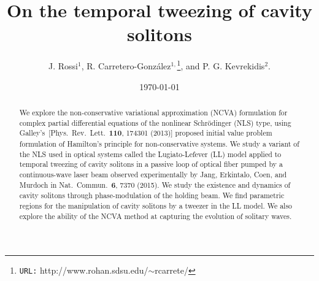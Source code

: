 \documentclass[aps,floatfix,showpacs,preprintnumbers,twocolumn,nofootinbib]{revtex4}
\begin{document}

\title{On the temporal tweezing of cavity solitons}
%
\author{J. Rossi$^{1}$, R. Carretero-Gonz\'{a}lez$^{1,}$\footnote{{\tt URL:} http://www.rohan.sdsu.edu/$\sim$rcarrete/}, and P. G. Kevrekidis$^{2}$.  }
\date{\today}

\begin{abstract}
We explore the non-conservative variational approximation (NCVA) formulation for complex partial differential equations of the nonlinear Schr\"{o}dinger (NLS) type, using Galley's~[Phys.~Rev.~Lett.~{\bf 110}, 174301 (2013)] proposed initial value problem formulation of Hamilton's principle for non-conservative systems.  We study a variant of the NLS used in optical systems called the Lugiato-Lefever (LL) model applied to temporal tweezing of cavity solitons in a passive loop of optical fiber pumped by a continuous-wave laser beam observed experimentally by Jang, Erkintalo, Coen, and Murdoch in Nat.~Commun.~{\bf 6}, 7370 (2015).  We study the existence and dynamics of cavity solitons through phase-modulation of the holding beam.  We find parametric regions for the manipulation of cavity solitons by a tweezer in the LL model.  We also explore the ability of the NCVA method at capturing the evolution of solitary waves.
%
\end{abstract}

\pacs{}
\maketitle


\end{document}
